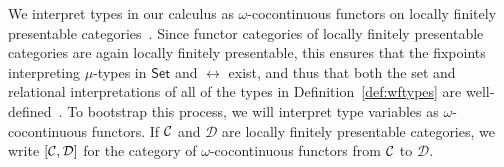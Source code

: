 \documentclass[runningheads]{llncs}
\newcommand{\set}{\mathsf{Set}}
\newcommand{\D}{\mathcal{D}}
\begin{document}
%
We interpret types in our calculus as $\omega$-cocontinuous functors
on locally finitely presentable categories~\cite{ar94}. Since functor
categories of locally finitely presentable categories are again
locally finitely presentable, this ensures that the fixpoints
interpreting $\mu$-types in $\set$ and $\rel$ exist, and thus that
both the set and relational interpretations of all of the types in
Definition~\ref{def:wftypes} are well-defined~\cite{jp19}. To
bootstrap this process, we will interpret type variables as
$\omega$-cocontinuous functors.
If $\cal C$ and $\D$ are locally finitely presentable categories, we
write $[\cal C,\D]$ for the category of $\omega$-cocontinuous functors
from $\cal C$ to $\D$.
\end{document}
